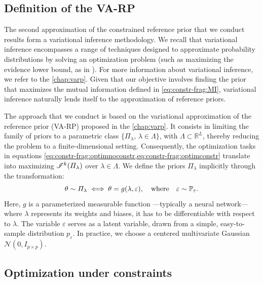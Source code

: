 \subsection{Definition of the VA-RP}\label{sec:constr-frags:subsec:varpdef}

The second approximation of the constrained reference prior that we conduct results form a variational inference methodology.
We recall that
variational inference encompasses a range of techniques designed to approximate probability distributions by solving an optimization problem (such as maximizing the evidence lower bound, as in \cite{kingma_auto-encoding_2014}). 
For more information about variational inference, we refer to the \cref{chap:varp}.
Given that our objective involves finding the prior that maximizes the mutual information defined in \cref{eq:constr-frag:MI}, variational inference naturally lends itself to the approximation of reference priors.  

The approach that we conduct is based on the variational approximation of the reference prior (VA-RP) proposed in the \cref{chap:varp}.
It consists in limiting the family of priors to a parametric class $\{\varPi_\lambda,\,\lambda\in\Lambda\}$, with $\Lambda\subset\mathbb{R}^L$, thereby reducing the problem to a finite-dimensional setting. Consequently, the optimization tasks in equations \cref{eq:constr-frag:optimnoconstr,eq:constr-frag:optimconstr} %
translate into maximizing $\mathscr{I}^k(\varPi_\lambda)$ over $\lambda\in\Lambda$. We define the priors $\varPi_\lambda$ implicitly through the transformation:
\begin{equation}
    \theta \sim \varPi_{\lambda} \iff \theta = g(\lambda,\varepsilon), \quad \text{where} \quad \varepsilon \sim \mathbb{P}_{\varepsilon}.
\end{equation}
Here, $g$ is a parameterized measurable function ---typically a neural network--- where $\lambda$ represents its weights and biases, it has to be differentiable with respect to $\lambda$. The variable $\varepsilon$ serves as a latent variable, drawn from a simple, easy-to-sample distribution ${p}_{\varepsilon}$. In practice, we choose a centered multivariate Gaussian $\mathcal{N}(0,I_{p\times p})$.  














\subsection{Optimization under constraints}\label{sec:constr-frags:subsec:optim}


